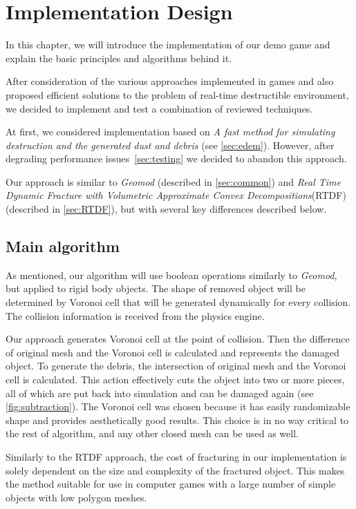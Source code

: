 \chapter{Implementation Design}
\label{chaptImplementation}
In this chapter, we will introduce the implementation of our demo game and explain the basic principles and algorithms behind it.

After consideration of the various approaches implemented in games and also proposed efficient solutions to the problem of real-time destructible environment, we decided to implement and test a combination of reviewed techniques.  

At first, we considered implementation based on \emph{A fast method for simulating destruction and the generated dust and debris} (see \cref{sec:edem}). However, after degrading performance issues~\cref{sec:testing} we decided to abandon this approach.

Our approach is similar to \emph{Geomod} (described in \cref{sec:common}) and \emph{Real Time Dynamic Fracture with Volumetric Approximate Convex Decompositions}(RTDF) (described in \cref{sec:RTDF}), but with several key differences described below. 

\section{Main algorithm}
As mentioned, our algorithm will use boolean operations similarly to \emph{Geomod}, but applied to rigid body objects. The shape of removed object will be determined by Voronoi cell that will be generated dynamically for every collision. The collision information is received from the physics engine.

Our approach generates Voronoi cell at the point of collision. Then the difference of original mesh and the Voronoi cell is calculated and represents the damaged object. To generate the debris, the intersection of original mesh and the Voronoi cell is calculated. This action effectively cuts the object into two or more pieces, all of which are put back into simulation and can be damaged again (see \cref{fig:subtraction}). The Voronoi cell was chosen because it has easily randomizable shape and provides aesthetically good results. This choice is in no way critical to the rest of algorithm, and any other closed mesh can be used as well.

Similarly to the RTDF approach, the cost of fracturing in our implementation is solely dependent on the size and complexity of the fractured object.  This makes the method suitable for use in computer games with a large number of simple objects with low polygon meshes.

